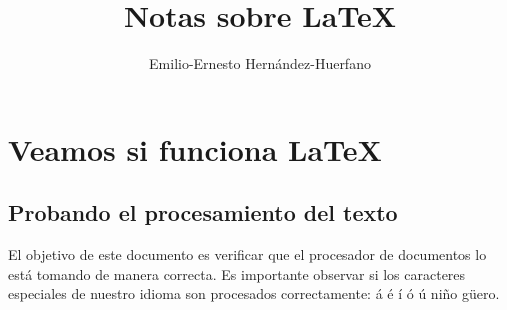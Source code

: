 \documentclass[12pt,letterpaper,oneside]{book}
\title{Notas sobre \LaTeX}
\author{Emilio-Ernesto Hernández-Huerfano}
\begin{document}
\maketitle
\chapter{Veamos si funciona \LaTeX}
\section{Probando el procesamiento del texto}
\noindent El objetivo de este documento es verificar que el procesador de documentos lo está tomando de manera correcta. Es importante observar si los caracteres especiales de nuestro idioma son procesados correctamente: á é í ó ú niño güero.
\end{document}
